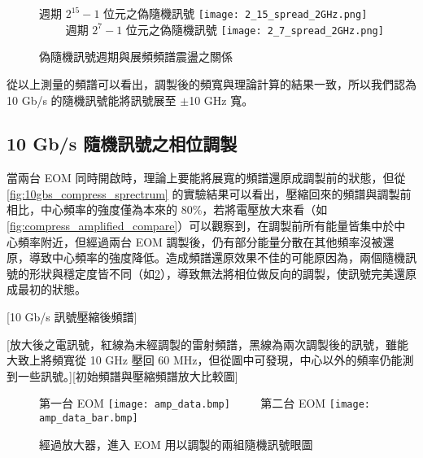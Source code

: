\documentclass[class=NCU_thesis, crop=false]{standalone}
\begin{document}
\begin{figure}[!hbt]
    \centering
    \subcaptionbox
        {週期 $2^{15}-1$ 位元之偽隨機訊號
        \label{fig:subfig_fig1}}
        {\texttt{[image: 2\_15\_spread\_2GHz.png]}}
    ~~~~
    \subcaptionbox
        {週期 $2^{7}-1$ 位元之偽隨機訊號
        \label{fig:subfig_fig2}}
        {\texttt{[image: 2\_7\_spread\_2GHz.png]}}
    \caption{偽隨機訊號週期與展頻頻譜震盪之關係}
    \label{fig:different_length_PRBS}
\end{figure}

從以上測量的頻譜可以看出，調製後的頻寬與理論計算的結果一致，所以我們認為 10 Gb/s 的隨機訊號能將訊號展至 $\pm$10 GHz 寬。

\subsection{10 Gb/s 隨機訊號之相位調製}

當兩台 EOM 同時開啟時，理論上要能將展寬的頻譜還原成調製前的狀態，但從\cref{fig:10gbs_compress_sprectrum} 的實驗結果可以看出，壓縮回來的頻譜與調製前相比，中心頻率的強度僅為本來的 80\%，若將電壓放大來看（如\cref{fig:compress_amplified_compare}）可以觀察到，在調製前所有能量皆集中於中心頻率附近，但經過兩台 EOM 調製後，仍有部分能量分散在其他頻率沒被還原，導致中心頻率的強度降低。造成頻譜還原效果不佳的可能原因為，兩個隨機訊號的形狀與穩定度皆不同（如\cref{fig:amplified_signal}），導致無法將相位做反向的調製，使訊號完美還原成最初的狀態。

[10 Gb/s 訊號壓縮後頻譜]

[放大後之電訊號，紅線為未經調製的雷射頻譜，黑線為兩次調製後的訊號，雖能大致上將頻寬從 10 GHz 壓回 60 MHz，但從圖中可發現，中心以外的頻率仍能測到一些訊號。][初始頻譜與壓縮頻譜放大比較圖]

\begin{figure}[!hbt]
    \centering
    \subcaptionbox
        {第一台 EOM 
        \label{fig:subfig_fig1}}
        {\texttt{[image: amp\_data.bmp]}}
    ~~~~
    \subcaptionbox
        {第二台 EOM
        \label{fig:subfig_fig2}}
        {\texttt{[image: amp\_data\_bar.bmp]}}
    \caption{經過放大器，進入 EOM 用以調製的兩組隨機訊號眼圖}
    \label{fig:amplified_signal}
\end{figure}
\end{document}
